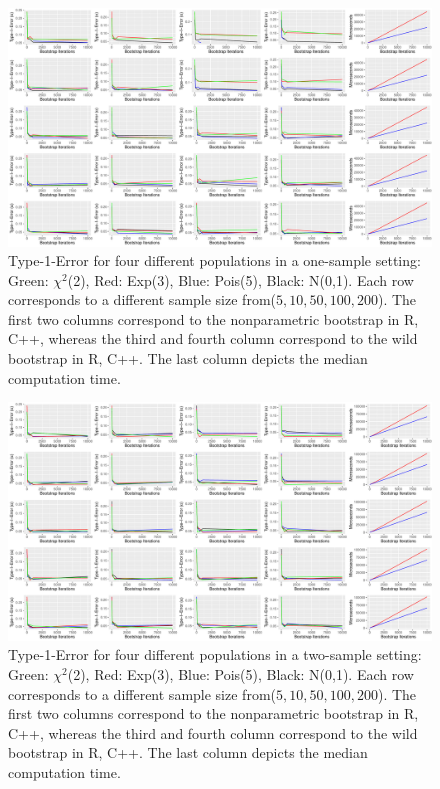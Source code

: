 \begin{figure}
\centering
	\includegraphics[scale=0.4]{./figures/plot_t1s1.pdf}
	\caption[Type-I-Error One Sample]{Type-1-Error for four different populations in a one-sample setting: Green: $\chi^2$(2), Red: Exp(3), Blue: Pois(5), Black: N(0,1). Each row corresponds to a different sample size from($5, 10, 50, 100, 200$). The first two columns correspond to the nonparametric bootstrap in R, C++, whereas the third and fourth column correspond to the wild bootstrap in R, C++. The last column depicts the median computation time.}
	\label{fig:t1_s1}
\end{figure}


\begin{figure}
\centering
	\includegraphics[scale=0.4]{./figures/plot_t1s2.pdf}
	\caption[Type-I-Error Two Sample]{Type-1-Error for four different populations in a two-sample setting: Green: $\chi^2$(2), Red: Exp(3), Blue: Pois(5), Black: N(0,1). Each row corresponds to a different sample size from($5, 10, 50, 100, 200$). The first two columns correspond to the nonparametric bootstrap in R, C++, whereas the third and fourth column correspond to the wild bootstrap in R, C++. The last column depicts the median computation time.}
	\label{fig:t1_s2}
\end{figure}

